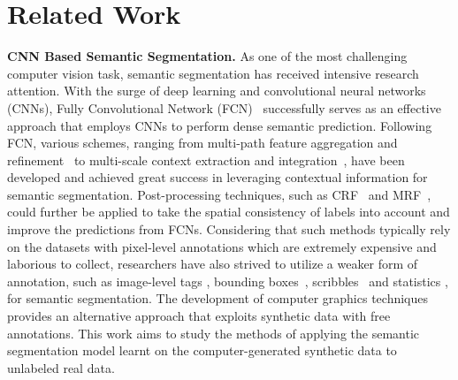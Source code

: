 \documentclass[10pt,twocolumn,letterpaper]{article}
\begin{document}
\section{Related Work}
\vspace{-0.05in}
\textbf{CNN Based Semantic Segmentation.} As one of the most challenging computer vision task, semantic segmentation has received intensive research attention. With the surge of deep learning and convolutional neural networks (CNNs), Fully Convolutional Network (FCN)~\cite{long2015fully} successfully serves as an effective approach that employs CNNs to perform dense semantic prediction. Following FCN, various schemes, ranging from multi-path feature aggregation and refinement~\cite{ghiasi2016laplacian,Lin:2017:RefineNet,Peng_2017_CVPR,Pohlen_2017_CVPR,zhang2019customizable,Zhao_2018_ECCV} to multi-scale context extraction and integration~\cite{chen2018searching,chen2016deeplab,He_2019_ICCV,qiu2017learning,yang2018denseaspp,Zhang_2018_CVPR_context,zhao2017pspnet}, have been developed and achieved great success in leveraging contextual information for semantic segmentation. Post-processing techniques, such as CRF~\cite{chen2016deeplab} and MRF~\cite{liu2018deep}, could further be applied to take the spatial consistency of labels into account and improve the predictions from FCNs. Considering that such methods typically rely on the datasets with pixel-level annotations which are extremely expensive and laborious to collect, researchers have also strived to utilize a weaker form of annotation, such as image-level tags \cite{papandreou2015weakly,pinheiro2015image}, bounding boxes~\cite{dai2015boxsup}, scribbles~\cite{bearman2016s} and statistics \cite{pathak2015constrained}, for semantic segmentation. The development of computer graphics techniques provides an alternative approach that exploits synthetic data with free annotations. This work aims to study the methods of applying the semantic segmentation model learnt on the computer-generated synthetic data to unlabeled real data.
\end{document}

